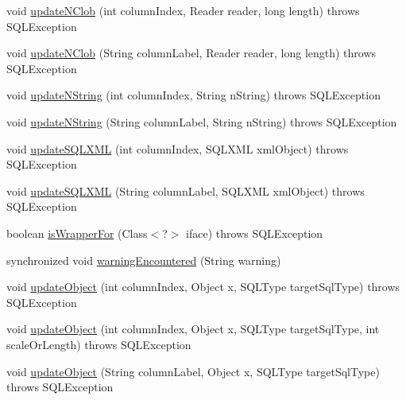 \begin{DoxyCompactItemize}
void \mbox{\hyperlink{classcom_1_1mysql_1_1cj_1_1jdbc_1_1result_1_1_result_set_impl_a1538ff529eb81f6cd5ae24a636bf2627}{update\+N\+Clob}} (int column\+Index, Reader reader, long length)  throws S\+Q\+L\+Exception 
\item 
void \mbox{\hyperlink{classcom_1_1mysql_1_1cj_1_1jdbc_1_1result_1_1_result_set_impl_ad2117ac48a372c4bb4723c63e42c8456}{update\+N\+Clob}} (String column\+Label, Reader reader, long length)  throws S\+Q\+L\+Exception 
\item 
void \mbox{\hyperlink{classcom_1_1mysql_1_1cj_1_1jdbc_1_1result_1_1_result_set_impl_aed47f8dccee46062705ae0ecb1524d2e}{update\+N\+String}} (int column\+Index, String n\+String)  throws S\+Q\+L\+Exception 
\item 
void \mbox{\hyperlink{classcom_1_1mysql_1_1cj_1_1jdbc_1_1result_1_1_result_set_impl_a74d169393f58a0e173558e19f3a89f30}{update\+N\+String}} (String column\+Label, String n\+String)  throws S\+Q\+L\+Exception 
\item 
void \mbox{\hyperlink{classcom_1_1mysql_1_1cj_1_1jdbc_1_1result_1_1_result_set_impl_a6ad86a9cba6c0bb5a8324945efb6461d}{update\+S\+Q\+L\+X\+ML}} (int column\+Index, S\+Q\+L\+X\+ML xml\+Object)  throws S\+Q\+L\+Exception 
\item 
void \mbox{\hyperlink{classcom_1_1mysql_1_1cj_1_1jdbc_1_1result_1_1_result_set_impl_a97b4b9e3ba5c55b9c577489289d6f743}{update\+S\+Q\+L\+X\+ML}} (String column\+Label, S\+Q\+L\+X\+ML xml\+Object)  throws S\+Q\+L\+Exception 
\item 
boolean \mbox{\hyperlink{classcom_1_1mysql_1_1cj_1_1jdbc_1_1result_1_1_result_set_impl_ade0a8182b48fb34ab1837d0c237bc79b}{is\+Wrapper\+For}} (Class$<$?$>$ iface)  throws S\+Q\+L\+Exception 
\item 
synchronized void \mbox{\hyperlink{classcom_1_1mysql_1_1cj_1_1jdbc_1_1result_1_1_result_set_impl_a5ec67812de95d09373cc9551d32f75eb}{warning\+Encountered}} (String warning)
\item 
void \mbox{\hyperlink{classcom_1_1mysql_1_1cj_1_1jdbc_1_1result_1_1_result_set_impl_aa901ccb14669f4e53a77196c37ad1844}{update\+Object}} (int column\+Index, Object x, S\+Q\+L\+Type target\+Sql\+Type)  throws S\+Q\+L\+Exception 
\item 
void \mbox{\hyperlink{classcom_1_1mysql_1_1cj_1_1jdbc_1_1result_1_1_result_set_impl_a4665dd7b89c44445ac0f83cd851b721a}{update\+Object}} (int column\+Index, Object x, S\+Q\+L\+Type target\+Sql\+Type, int scale\+Or\+Length)  throws S\+Q\+L\+Exception 
\item 
void \mbox{\hyperlink{classcom_1_1mysql_1_1cj_1_1jdbc_1_1result_1_1_result_set_impl_ae7f59957c7db8eaeeb84b59646ffe7d1}{update\+Object}} (String column\+Label, Object x, S\+Q\+L\+Type target\+Sql\+Type)  throws S\+Q\+L\+Exception 

\end{DoxyCompactItemize}
